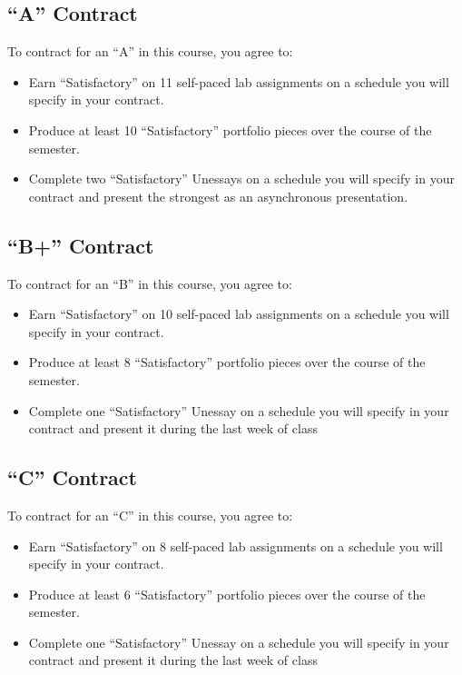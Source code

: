 \hypertarget{a-contract}{%
\subsection{``A'' Contract}\label{a-contract}}

To contract for an ``A'' in this course, you agree to:

\begin{itemize}
\item
  Earn ``Satisfactory'' on 11 self-paced lab assignments on a schedule you will specify in your contract.
\item
  Produce at least 10 ``Satisfactory'' portfolio pieces over the course of the semester.
\item
  Complete two ``Satisfactory'' Unessays on a schedule you will specify in your contract and present the strongest as an asynchronous presentation.
\end{itemize}

\hypertarget{b-contract}{%
\subsection{``B+'' Contract}\label{b-contract}}

To contract for an ``B'' in this course, you agree to:

\begin{itemize}
\item
  Earn ``Satisfactory'' on 10 self-paced lab assignments on a schedule you will specify in your contract.
\item
  Produce at least 8 ``Satisfactory'' portfolio pieces over the course of the semester.
\item
  Complete one ``Satisfactory'' Unessay on a schedule you will specify in your contract and present it during the last week of class
\end{itemize}

\hypertarget{c-contract}{%
\subsection{``C'' Contract}\label{c-contract}}

To contract for an ``C'' in this course, you agree to:

\begin{itemize}
\item
  Earn ``Satisfactory'' on 8 self-paced lab assignments on a schedule you will specify in your contract.
\item
  Produce at least 6 ``Satisfactory'' portfolio pieces over the course of the semester.
\item
  Complete one ``Satisfactory'' Unessay on a schedule you will specify in your contract and present it during the last week of class
\end{itemize}

